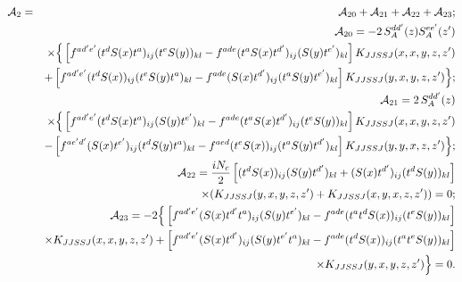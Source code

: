 \documentclass[11pt,a4paper]{article}
\begin{document}
\begin{eqnarray}
{\cal A}_2&=& {\cal A}_{20}+{\cal A}_{21}+{\cal A}_{22}+{\cal A}_{23}; \nonumber \\ 
&&{\cal A}_{20}=- 2\,S_{A}^{dd^{\prime}}(z) S_{A}^{ee^{\prime}}(z^{\prime})\nonumber \\
&&
\times \Big\{\left[f^{ad^{\prime}e^{\prime}}(t^{d}S(x)t^{a})_{ij}(t^{e}S(y))_{kl}-f^{ade}(t^{a}S(x)t^{d^{\prime}})_{ij}(S(y)t^{e^{\prime}})_{kl}\right]K_{JJSSJ}(x,x,y,z,z^{\prime})\nonumber \\
&&+\left[f^{ad^{\prime}e^{\prime}}(t^{d}S(x))_{ij}(t^{e}S(y)t^{a})_{kl}-f^{ade}(S(x)t^{d^{\prime}})_{ij}(t^{a}S(y)t^{e^{\prime}})_{kl}\right]K_{JJSSJ}(y,x,y,z,z^{\prime})\Big\}; \nonumber \\
&&{\cal A}_{21}= 2\,S_{A}^{dd^{\prime}}(z) \nonumber \\
&&\times \Big\{\left[f^{ad^{\prime}e^\prime}(t^{d}S(x)t^{a})_{ij}(S(y)t^{e^\prime})_{kl}-f^{ade}(t^{a}S(x)t^{d^{\prime}})_{ij}(t^{e}S(y))_{kl}\right]K_{JJSSJ}(x,x,y,z,z^{\prime})\nonumber \\
&&- \left[f^{ae^{\prime}d^{\prime}}(S(x)t^{e^\prime})_{ij}(t^{d}S(y)t^{a})_{kl}-f^{aed}(t^{e}S(x))_{ij}(t^{a}S(y)t^{d^{\prime}})_{kl}\right] K_{JJSSJ}(y,y,x,z,z^{\prime})\Big\}; \nonumber \\
&&{\cal A}_{22}={iN_c\over 2} \left[ (t^{d}S(x))_{ij}(S(y)t^{d^{\prime}})_{kl}+(S(x)t^{d^{\prime}})_{ij}(t^{d}S(y))_{kl}\right]\nonumber \\
&&\times (K_{JJSSJ}(y,x,y,z,z^{\prime})+ K_{JJSSJ}(x,y,x,z,z^{\prime}))=0;\nonumber \\
&&{\cal A}_{23}=-2  \Big\{\left[f^{ad^{\prime}e^{\prime}}(S(x)t^{d^{\prime}}t^{a})_{ij}(S(y)t^{e^\prime})_{kl}-f^{ade}(t^{a}t^{d}S(x))_{ij}(t^{e}S(y))_{kl}\right]\nonumber \\
&&\times K_{JJSSJ}(x,x,y,z,z^{\prime})
+\left[f^{ad^{\prime}e^{\prime}}(S(x)t^{d^\prime})_{ij}(S(y)t^{e^\prime}t^{a})_{kl}-f^{ade}(t^{d}S(x))_{ij}(t^{a}t^{e}S(y))_{kl}\right]\nonumber \\
&&\times K_{JJSSJ}(y,x,y,z,z^{\prime})\Big\}=0 .
\end{eqnarray}
\end{document}
